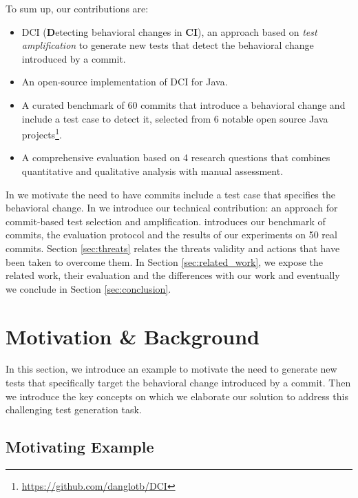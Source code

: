 To sum up, our contributions are:
\begin{itemize}
\item DCI (\textbf{D}etecting behavioral changes in \textbf{CI}), an approach based on \emph{test amplification} to generate new tests that detect the behavioral change introduced by a commit.
\item An open-source implementation of DCI for Java.
\item A curated benchmark of 60 commits that introduce a behavioral change and include a test case to detect it, selected from 6 notable open source Java projects\footnote{\url{https://github.com/danglotb/DCI}}.
\item A comprehensive evaluation based on 4 research questions that combines quantitative and qualitative analysis with manual assessment.
\end{itemize}

In  we motivate the need to have commits include a test case that specifies the behavioral change. In  we introduce our technical contribution: an approach for commit-based test selection and amplification.  introduces our benchmark of commits, the evaluation protocol and the results of our experiments on 50 real commits. 
Section \ref{sec:threats} relates the threats validity and actions that have been taken to overcome them. In Section  \ref{sec:related_work}, we expose the related work, their evaluation and the differences with our work and eventually we conclude in Section \ref{sec:conclusion}.

\section{Motivation \& Background}
\label{sec:background}

In this section, we introduce an example to motivate the need to generate new tests that specifically target the behavioral change introduced by a commit.
Then we introduce the key concepts on which we elaborate our solution to address this challenging test generation task.

\subsection{Motivating Example}

